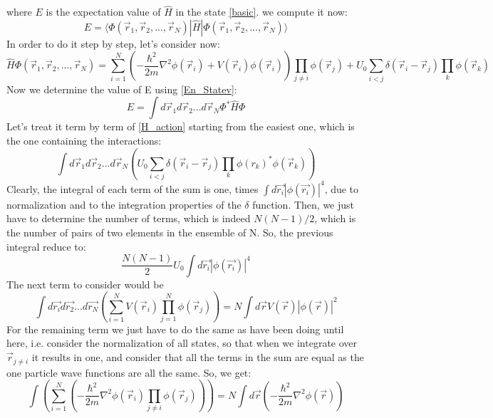 \documentclass[a4paper,10pt]{article}
\begin{document}
where $E$ is the expectation value of $\hat{H}$ in the state \ref{basic}. we compute it now:
\begin{equation}\label{En_Statev}
 E=\langle\Phi(\vec{r}_1,\vec{r}_2,...,\vec{r}_N)|\hat{H}|\Phi(\vec{r}_1,\vec{r}_2,...,\vec{r}_N)\rangle
\end{equation}
In order to do it step by step, let's consider now:
\begin{equation}\label{H_action}
 \hat{H}\Phi(\vec{r}_1,\vec{r}_2,...,\vec{r}_N)=\sum_{i=1}^{N}\left(-\frac{\hbar^2}{2m}\nabla^2\phi(\vec{r}_i)+V(\vec{r}_i)\phi(\vec{r}_i)\right)\prod_{j\neq i}\phi(\vec{r}_j)+U_0\sum_{i<j}\delta(\vec{r}_i-\vec{r}_j)\prod_{k}\phi(\vec{r}_k)
\end{equation}
Now we determine the value of E using \ref{En_Statev}:
\begin{equation}\label{Energy}
 E=\int d\vec{r}_1 d\vec{r}_2 ... d\vec{r}_N \Phi^{*}\hat{H}\Phi
\end{equation}
Let's treat it term by term of \ref{H_action} starting from the easiest one, which is the one containing the interactions:
\begin{equation}
\int  d\vec{r}_1 d\vec{r}_2 ... d\vec{r}_N \left( U_0\sum_{i<j}\delta(\vec{r}_i-\vec{r}_j)\prod_{k}\phi(r_k)^{*}\phi(\vec{r}_k)\right)
\end{equation}
Clearly, the integral of each term of the sum is one, times $\int d\vec{r_i} |\phi(\vec{r_i})|^4$, due to normalization and to the integration properties of the $\delta$ function. Then, we just have to determine the number of terms, which is indeed $N(N-1)/2$, which is the number of pairs of two elements in the ensemble of N. So, the previous integral reduce to:
\begin{equation}\label{term3}
 \frac{N(N-1)}{2}U_0\int d\vec{r_i} |\phi(\vec{r_i})|^4
\end{equation}
The next term to consider would be
\begin{equation}\label{term2}
 \int d\vec{r_i} d\vec{r_2} ... d\vec{r_N}\left(\sum_{i=1}^{N}V(\vec{r}_i)\prod_{j=1}^{N}\phi(\vec{r}_j)\right)=N\int d\vec{r} V(\vec{r})|\phi(\vec{r})|^2
\end{equation}
For the remaining term we just have to do the same as have been doing until here, i.e. consider the normalization of all states, so that when we integrate over $\vec{r}_{j\neq i}$ it results in one, and consider that all the terms in the sum are equal as the one particle wave functions are all the same. So, we get:
\begin{equation}
 \int \left(\sum_{i=1}^{N}\left(-\frac{\hbar^2}{2m}\nabla^2\phi(\vec{r}_i)\prod_{j\neq i}\phi(\vec{r}_j)\right)\right)=N\int d\vec{r} \left(-\frac{\hbar^2}{2m}\nabla^2\phi(\vec{r})\right)
\end{equation}
\end{document}
